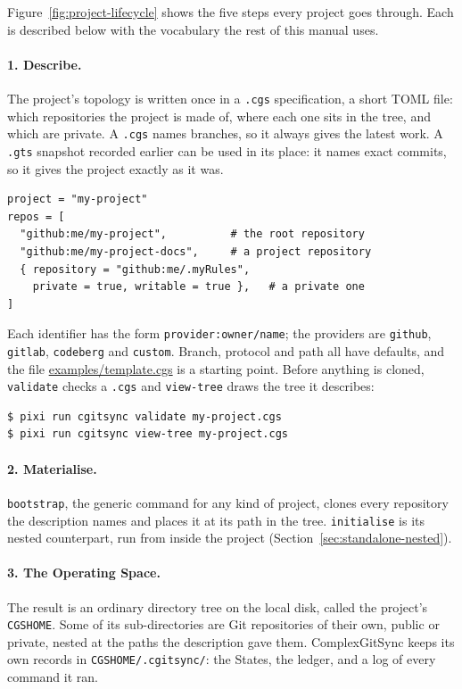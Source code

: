 Figure~\ref{fig:project-lifecycle} shows the five steps every project goes
through. Each is described below with the vocabulary the rest of this manual
uses.

\paragraph{1. Describe.} The project's topology is written once in a
\texttt{.cgs} specification, a short TOML file: which repositories the project
is made of, where each one sits in the tree, and which are private. A
\texttt{.cgs} names branches, so it always gives the latest work. A
\texttt{.gts} snapshot recorded earlier can be used in its place: it names
exact commits, so it gives the project exactly as it was.

\begin{lstlisting}
project = "my-project"
repos = [
  "github:me/my-project",          # the root repository
  "github:me/my-project-docs",     # a project repository
  { repository = "github:me/.myRules",
    private = true, writable = true },   # a private one
]
\end{lstlisting}

Each identifier has the form \texttt{provider:owner/name}; the providers are
\texttt{github}, \texttt{gitlab}, \texttt{codeberg} and \texttt{custom}.
Branch, protocol and path all have defaults, and the file
\url{examples/template.cgs} is a starting point. Before anything is
cloned, \texttt{validate} checks a \texttt{.cgs} and \texttt{view-tree}
draws the tree it describes:

\begin{lstlisting}[language=bash]
$ pixi run cgitsync validate my-project.cgs
$ pixi run cgitsync view-tree my-project.cgs
\end{lstlisting}

\paragraph{2. Materialise.} \texttt{bootstrap}, the generic command for any
kind of project, clones every repository the description names and places it
at its path in the tree. \texttt{initialise} is its nested counterpart, run
from inside the project (Section~\ref{sec:standalone-nested}).

\paragraph{3. The Operating Space.} The result is an ordinary directory tree
on the local disk, called the project's \texttt{CGSHOME}. Some of its
sub-directories are Git repositories of their own, public or private, nested
at the paths the description gave them. ComplexGitSync keeps its own records
in \texttt{CGSHOME/.cgitsync/}: the States, the ledger, and a log of every
command it ran.

